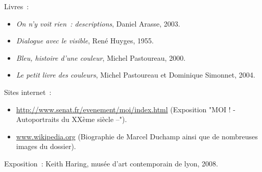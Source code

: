 \vspace{5em}

Livres :
\begin{itemize}
	\item \emph{On n’y voit rien : descriptions}, Daniel Arasse, 2003.
	\item \emph{Dialogue avec le visible}, René Huyges, 1955.
	\item \emph{Bleu, histoire d’une couleur}, Michel Pastoureau, 2000.
	\item \emph{Le petit livre des couleurs}, Michel Pastoureau et Dominique Simonnet, 2004.
\end{itemize}

\vspace{3em}

Sites internet :
\begin{itemize}
	\item \url{http://www.senat.fr/evenement/moi/index.html} (Exposition "MOI ! - Autoportraits du XXème siècle –").
	\item \url{www.wikipedia.org} (Biographie de Marcel Duchamp ainsi que de nombreuses images du dossier).
\end{itemize}

\vspace{3em}

Exposition :
Keith Haring, musée d’art contemporain de lyon, 2008.
